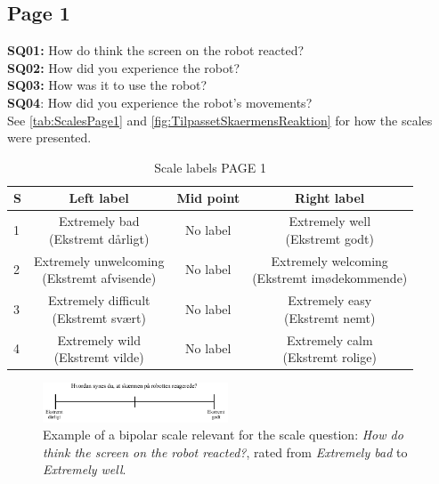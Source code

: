 \subsection{Page 1}
\noindent
\textbf{SQ01:} How do think the screen on the robot reacted? \\%
\textbf{SQ02:} How did you experience the robot? \\ %
\textbf{SQ03:} How was it to use the robot?\\%
\textbf{SQ04}: How did you experience the robot's movements? \\%
See \autoref{tab:ScalesPage1} and \autoref{fig:TilpassetSkaermensReaktion} for how the scales were presented.
\begin{table}[H]
	\centering
\caption{Scale labels PAGE 1}
	\label{tab:ScalesPage1} 
	\begin{tabular}{l|c|c|c}
		S     & Left label & Mid point & Right label \\\hline
		1   & \makecell{Extremely bad\\(Ekstremt dårligt)}  & No label & \makecell{Extremely well \\(Ekstremt godt)}        \\\hline
		2   & \makecell{Extremely unwelcoming \\(Ekstremt afvisende)} & No label & \makecell{Extremely welcoming \\(Ekstremt imødekommende)}         \\\hline
		3   & \makecell{Extremely difficult \\(Ekstremt svært)} & No label & \makecell{Extremely easy \\(Ekstremt nemt)}         \\\hline
	 	4   & \makecell{Extremely wild \\(Ekstremt vilde)} & No label & \makecell{Extremely calm \\(Ekstremt rolige)}               
	\end{tabular}        
\end{table}
\noindent
%
\begin{figure}[H]
\centering
\includegraphics[width = 0.49\textwidth]{Figure/TilpassetSkaermensReaktion}
\setlength{} 
\caption{Example of a bipolar scale relevant for the scale question: \textit{How do think the screen on the robot reacted?}, rated from \textit{Extremely bad} to \textit{Extremely well}.}
\label{fig:TilpassetSkaermensReaktion}
\end{figure}
\noindent
% 
